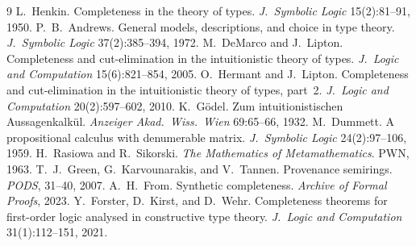 \documentclass[11pt]{article}
\theoremstyle{plain}
\theoremstyle{definition}
\begin{document}
\begin{thebibliography}{9}\small
{} L.~Henkin. Completeness in the theory of types.
  \emph{J.\ Symbolic Logic} 15(2):81--91, 1950.
 P.~B.~Andrews. General models, descriptions, and choice in
  type theory. \emph{J.\ Symbolic Logic} 37(2):385--394, 1972.
 M.~DeMarco and J.~Lipton. Completeness and
  cut-elimination in the intuitionistic theory of types. \emph{J.\ Logic and
  Computation} 15(6):821--854, 2005.
 O.~Hermant and J.~Lipton. Completeness and
  cut-elimination in the intuitionistic theory of types, part~2.
  \emph{J.\ Logic and Computation} 20(2):597--602, 2010.
 K.~G\"odel. Zum intuitionistischen Aussagenkalk\"ul.
  \emph{Anzeiger Akad.\ Wiss.\ Wien} 69:65--66, 1932.
 M.~Dummett. A propositional calculus with denumerable
  matrix. \emph{J.\ Symbolic Logic} 24(2):97--106, 1959.
 H.~Rasiowa and R.~Sikorski. \emph{The Mathematics
  of Metamathematics}. PWN, 1963.
 T.~J.~Green, G.~Karvounarakis, and V.~Tannen.
  Provenance semirings. \emph{PODS}, 31--40, 2007.
 A.~H.~From. Synthetic completeness. \emph{Archive of Formal
  Proofs}, 2023.
 Y.~Forster, D.~Kirst, and D.~Wehr. Completeness
  theorems for first-order logic analysed in constructive type theory.
  \emph{J.\ Logic and Computation} 31(1):112--151, 2021.
\end{thebibliography}
\end{document}
